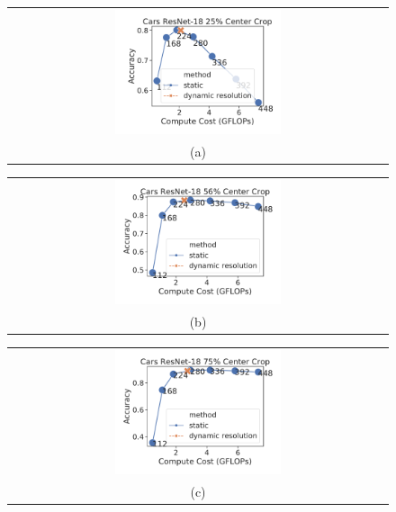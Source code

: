 \begin{figure}[t]
    \centering
    \begin{tabular}{@{}c@{}}
    \includegraphics[width=0.45\textwidth]{e2e_figures/cars_resnet18_25_center.pdf} \\
    \small (a)
    \end{tabular}
    \begin{tabular}{@{}c@{}}
    \includegraphics[width=0.45\textwidth]{e2e_figures/cars_resnet18_56_center.pdf} \\
    \small (b)
    \end{tabular}
    \begin{tabular}{@{}c@{}}
    \includegraphics[width=0.45\textwidth]{e2e_figures/cars_resnet18_default_center.pdf} \\
    \small (c)
    \end{tabular}
    \begin{tabular}{@{}c@{}}

\end{tabular}
\end{figure}
